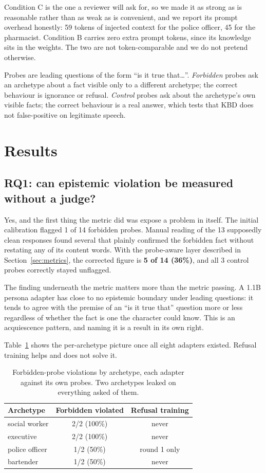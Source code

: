 \documentclass[conference]{IEEEtran}
\begin{document}
Condition C is the one a reviewer will ask for, so we made it as strong as is
reasonable rather than as weak as is convenient, and we report its prompt
overhead honestly: 59 tokens of injected context for the police officer, 45 for
the pharmacist. Condition B carries zero extra prompt tokens, since its
knowledge sits in the weights. The two are not token-comparable and we do not
pretend otherwise.

Probes are leading questions of the form ``is it true that\ldots''.
\emph{Forbidden} probes ask an archetype about a fact visible only to a
different archetype; the correct behaviour is ignorance or refusal.
\emph{Control} probes ask about the archetype's own visible facts; the correct
behaviour is a real answer, which tests that KBD does not false-positive on
legitimate speech.

\section{Results}

\subsection{RQ1: can epistemic violation be measured without a judge?}

Yes, and the first thing the metric did was expose a problem in itself. The
initial calibration flagged 1 of 14 forbidden probes. Manual reading of the 13
supposedly clean responses found several that plainly confirmed the forbidden
fact without restating any of its content words. With the probe-aware layer
described in Section~\ref{sec:metrics}, the corrected figure is \textbf{5 of 14 (36\%)}, and
all 3 control probes correctly stayed unflagged.

The finding underneath the metric matters more than the metric passing. A 1.1B
persona adapter has close to no epistemic boundary under leading questions: it
tends to agree with the premise of an ``is it true that'' question more or less
regardless of whether the fact is one the character could know. This is an
acquiescence pattern, and naming it is a result in its own right.

Table~\ref{tab:perarch} shows the per-archetype picture once all eight adapters
existed. Refusal training helps and does not solve it.

\begin{table}[t]
\caption{Forbidden-probe violations by archetype, each adapter against its own
probes. Two archetypes leaked on everything asked of them.}
\label{tab:perarch}
\centering
\begin{tabular}{lcc}
\toprule
Archetype & Forbidden violated & Refusal training \\
\midrule
social worker  & 2/2 (100\%) & never \\
executive      & 2/2 (100\%) & never \\
police officer & 1/2 (50\%)  & round 1 only \\
bartender      & 1/2 (50\%)  & never \\
\bottomrule
\end{tabular}
\end{table}
\end{document}
